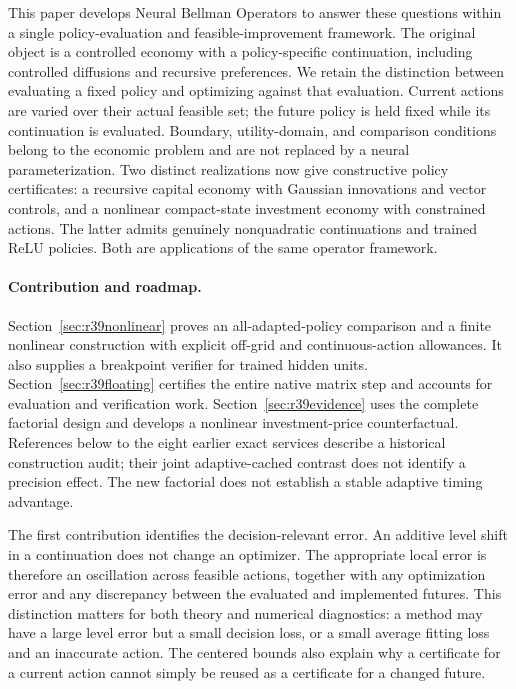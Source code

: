 \documentclass[ecta,nameyear,draft]{econsocart}
\theoremstyle{definition}
\theoremstyle{remark}
\begin{document}
This paper develops Neural Bellman Operators to answer these questions within
a single policy-evaluation and feasible-improvement framework. The original
object is a controlled economy with a policy-specific continuation, including
controlled diffusions and recursive preferences. We retain the distinction
between evaluating a fixed policy and optimizing against that evaluation.
Current actions are varied over their actual feasible set; the future policy
is held fixed while its continuation is evaluated. Boundary, utility-domain,
and comparison conditions belong to the economic problem and are not
replaced by a neural parameterization. Two distinct realizations now give constructive policy certificates: a recursive capital economy with Gaussian innovations and vector controls, and a nonlinear compact-state investment economy with constrained actions. The latter admits genuinely nonquadratic continuations and trained ReLU policies. Both are applications of the same operator framework.

\paragraph{Contribution and roadmap.}
Section~\ref{sec:r39nonlinear} proves an all-adapted-policy comparison and a finite nonlinear construction with explicit off-grid and continuous-action allowances. It also supplies a breakpoint verifier for trained hidden units. Section~\ref{sec:r39floating} certifies the entire native matrix step and accounts for evaluation and verification work. Section~\ref{sec:r39evidence} uses the complete factorial design and develops a nonlinear investment-price counterfactual. References below to the eight earlier exact services describe a historical construction audit; their joint adaptive-cached contrast does not identify a precision effect. The new factorial does not establish a stable adaptive timing advantage.


The first contribution identifies the decision-relevant error. An additive
level shift in a continuation does not change an optimizer. The appropriate
local error is therefore an oscillation across feasible actions, together
with any optimization error and any discrepancy between the evaluated and
implemented futures. This distinction matters for both theory and numerical
diagnostics: a method may have a large level error but a small decision loss,
or a small average fitting loss and an inaccurate action. The centered bounds
also explain why a certificate for a current action cannot simply be reused
as a certificate for a changed future.
\end{document}
